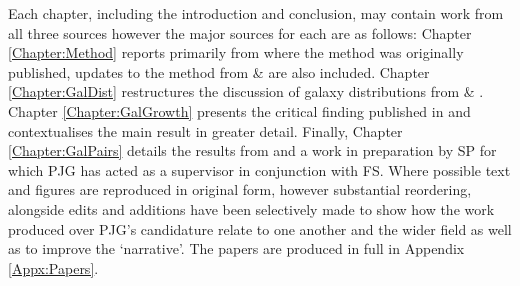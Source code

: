 Each chapter, including the introduction and conclusion, may contain work from all three sources however the major sources for each are as follows: Chapter \ref{Chapter:Method} reports primarily from  where the method was originally published, updates to the method from  \&  are also included. Chapter \ref{Chapter:GalDist} restructures the discussion of galaxy distributions from  \& . Chapter \ref{Chapter:GalGrowth} presents the critical finding published in  and contextualises the main result in greater detail. Finally, Chapter \ref{Chapter:GalPairs} details the results from  and a work in preparation by SP for which PJG has acted as a supervisor in conjunction with FS. Where possible text and figures are reproduced in original form, however substantial reordering, alongside edits and additions have been selectively made to show how the work produced over PJG's candidature relate to one another and the wider field as well as to improve the `narrative'. The papers are produced in full in Appendix \ref{Appx:Papers}.

